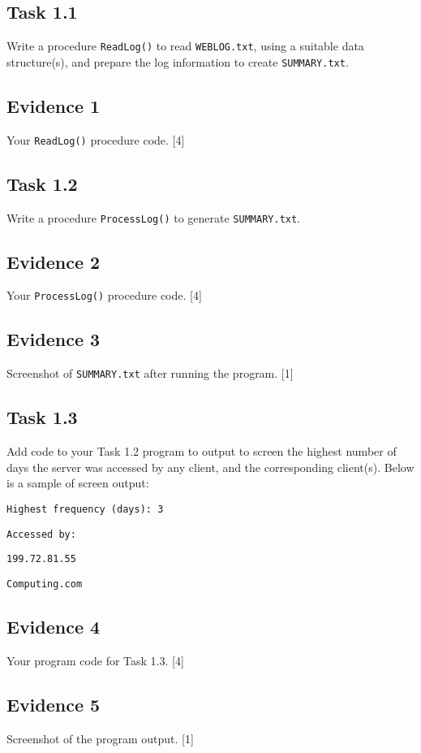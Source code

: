 \subsection*{Task 1.1}

Write a procedure \texttt{ReadLog()} to read \texttt{WEBLOG.txt},
using a suitable data structure(s), and prepare the log information
to create \texttt{SUMMARY.txt}.

\subsection*{Evidence 1 }

Your \texttt{ReadLog()} procedure code. \hfill{}{[}4{]}

\subsection*{Task 1.2 }

Write a procedure \texttt{ProcessLog()} to generate \texttt{SUMMARY.txt}. 

\subsection*{Evidence 2}

Your \texttt{ProcessLog()} procedure code.\hfill{} {[}4{]}

\subsection*{Evidence 3 }

Screenshot of \texttt{SUMMARY.txt} after running the program. \hfill{}{[}1{]}

\subsection*{Task 1.3 }

Add code to your Task 1.2 program to output to screen the highest
number of days the server was accessed by any client, and the corresponding
client(s). Below is a sample of screen output:

\noindent\begin{minipage}[t]{1\columnwidth}%
\texttt{Highest frequency (days): 3 }

\texttt{Accessed by: }

\texttt{199.72.81.55}

\texttt{Computing.com}%
\end{minipage}

\subsection*{Evidence 4}

Your program code for Task 1.3.\hfill{} {[}4{]}

\subsection*{Evidence 5}

Screenshot of the program output. \hfill{}{[}1{]}